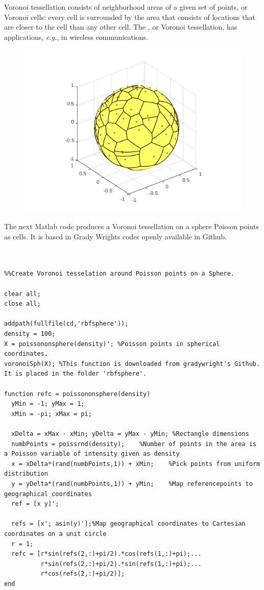 \documentclass{article}
\begin{document}
Voronoi tessellation consists of neighborhood areas of a given set of points, or Voronoi cells: every cell is surrounded by the area that consists of locations that are closer to the cell than any other cell. The , or Voronoi tessellation, has applications, \textit{e.g.}, in wireless communications. 

\begin{figure}
  \includegraphics[width=\linewidth]{voronoionsphere.png}
\end{figure}


The next Matlab code produces a Voronoi tessellation on a sphere Poisson points as cells. It is based in Grady Wrights codes openly available in Github. 

\begin{verbatim}


%%Create Voronoi tesselation around Poisson points on a Sphere.

clear all;
close all;

addpath(fullfile(cd,'rbfsphere'));
density = 100;
X = poissononsphere(density)'; %Poisson points in spherical coordinates.
voronoiSph(X); %This function is downloaded from gradywright's Github. It is placed in the folder 'rbfsphere'.

function refc = poissononsphere(density)
  yMin = -1; yMax = 1;
  xMin = -pi; xMax = pi;
  
  xDelta = xMax - xMin; yDelta = yMax - yMin; %Rectangle dimensions
  numbPoints = poissrnd(density);    %Number of points in the area is a Poisson variable of intensity given as density
  x = xDelta*(rand(numbPoints,1)) + xMin;    %Pick points from uniform distribution
  y = yDelta*(rand(numbPoints,1)) + yMin;    %Map referencepoints to geographical coordinates
  ref = [x y]';

  refs = [x'; asin(y)'];%Map geographical coordinates to Cartesian coordinates on a unit circle
  r = 1;
  refc = [r*sin(refs(2,:)+pi/2).*cos(refs(1,:)+pi);...
          r*sin(refs(2,:)+pi/2).*sin(refs(1,:)+pi);...
          r*cos(refs(2,:)+pi/2)];
end

\end{verbatim}
\end{document}
